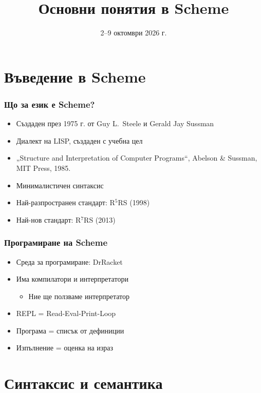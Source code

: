 \documentclass[alsotrans,beameroptions={aspectratio=169}]{beamerswitch}
\title{Основни понятия в Scheme}
\date{2--9 октомври 2026 г.}
\begin{document}
\begin{frame}
  \titlepage
\end{frame}

\section{Въведение в Scheme}

\begin{frame}
  \frametitle{Що за език е Scheme?}

  \begin{itemize}
  \item Създаден през 1975 г. от Guy L.~Steele и Gerald Jay Sussman
  \item Диалект на LISP, създаден с учебна цел
  \item „Structure and Interpretation of Computer Programs“, Abelson \& Sussman, MIT Press, 1985.
  \item Минималистичен синтаксис
  \item Най-разпространен стандарт: R$^5$RS (1998)
  \item Най-нов стандарт: R$^7$RS (2013)
  \end{itemize}
\end{frame}

\begin{frame}
  \frametitle{Програмиране на Scheme}

  \begin{itemize}
  \item Среда за програмиране: DrRacket
  \item Има компилатори и интерпретатори
    \begin{itemize}
    \item Ние ще ползваме интерпретатор
    \end{itemize}
  \item REPL = Read-Eval-Print-Loop
  \item Програма = списък от дефиниции
  \item Изпълнение = оценка на израз
  \end{itemize}
\end{frame}

\section{Синтаксис и семантика}
\end{document}
